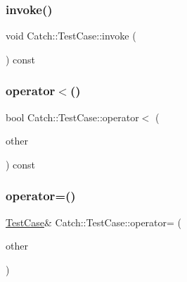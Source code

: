 \hypertarget{class_catch_1_1_test_case_a26f346c8446dded0562fe3818ae71651}{}\label{class_catch_1_1_test_case_a26f346c8446dded0562fe3818ae71651} 
\subsubsection{\texorpdfstring{invoke()}{invoke()}}
{\footnotesize\ttfamily void Catch\+::\+Test\+Case\+::invoke (\begin{DoxyParamCaption}{ }\end{DoxyParamCaption}) const}

\hypertarget{class_catch_1_1_test_case_a030e4b9282e9b32e08c8bd5e5cd6fa98}{}\label{class_catch_1_1_test_case_a030e4b9282e9b32e08c8bd5e5cd6fa98} 
\subsubsection{\texorpdfstring{operator$<$()}{operator<()}}
{\footnotesize\ttfamily bool Catch\+::\+Test\+Case\+::operator$<$ (\begin{DoxyParamCaption}\item[{\hyperlink{class_catch_1_1_test_case}{Test\+Case} const \&}]{other }\end{DoxyParamCaption}) const}

\hypertarget{class_catch_1_1_test_case_a8022e3f74232f7887d2d2cbbc8876502}{}\label{class_catch_1_1_test_case_a8022e3f74232f7887d2d2cbbc8876502} 
\subsubsection{\texorpdfstring{operator=()}{operator=()}}
{\footnotesize\ttfamily \hyperlink{class_catch_1_1_test_case}{Test\+Case}\& Catch\+::\+Test\+Case\+::operator= (\begin{DoxyParamCaption}\item[{\hyperlink{class_catch_1_1_test_case}{Test\+Case} const \&}]{other }\end{DoxyParamCaption})}

\hypertarget{class_catch_1_1_test_case_a5456d03a90f75292835c158f3a3374a1}{}\label{class_catch_1_1_test_case_a5456d03a90f75292835c158f3a3374a1} 
